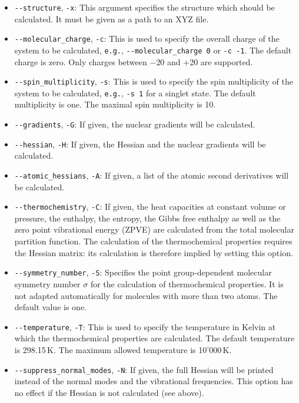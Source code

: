 \documentclass[]{tufte-book}
\begin{document}
\begin{itemize}
\item \texttt{-{}-structure}, \texttt{-x}: This argument specifies the structure which should be calculated. It must be given
as a path to an XYZ file.
\item \texttt{-{}-molecular\_charge}, \texttt{-c}: This is used to specify the overall charge of the system to be calculated, 
\texttt{e.g.}, \texttt{-{}-molecular\_charge 0} or \texttt{-c -1}. The default charge is zero.
Only charges between $-$20 and +20 are supported.
\item \texttt{-{}-spin\_multiplicity}, \texttt{-s}: This is used to specify the spin multiplicity of the system to be
calculated, \texttt{e.g.}, \texttt{-s 1} for a singlet state. The default multiplicity is one. The maximal spin multiplicity is 10.
\item \texttt{-{}-gradients}, \texttt{-G}: If given, the nuclear gradients will be calculated.
\item \texttt{-{}-hessian}, \texttt{-H}: If given, the Hessian and the nuclear gradients will be calculated.
\item \texttt{-{}-atomic\_hessians}, \texttt{-A}: If given, a list of the atomic second derivatives will be calculated.
\item \texttt{-{}-thermochemistry}, \texttt{-C}: If given, the heat capacities at constant volume or pressure, 
the enthalpy, the entropy, the Gibbs free enthalpy as well as the zero point vibrational energy (ZPVE) are calculated
from the total molecular partition function.
The calculation of the thermochemical properties requires the Hessian matrix: its calculation is therefore implied by setting this option.
\item \texttt{-{}-symmetry\_number}, \texttt{-S}: Specifies the point group-dependent molecular symmetry number $\sigma$ for the calculation of thermochemical properties.
It is not adapted automatically for molecules with more than two atoms. The default value is one. 
\item \texttt{-{}-temperature}, \texttt{-T}: This is used to specify the temperature in Kelvin at which the thermochemical properties are calculated.
The default temperature is 298.15\,K. The maximum allowed temperature is 10'000\,K.
\item \texttt{-{}-suppress\_normal\_modes}, \texttt{-N}: If given, the full Hessian will be printed instead of the normal 
modes and the vibrational frequencies. This option has no effect if the Hessian is not calculated (see above).

\end{itemize}
\end{document}
